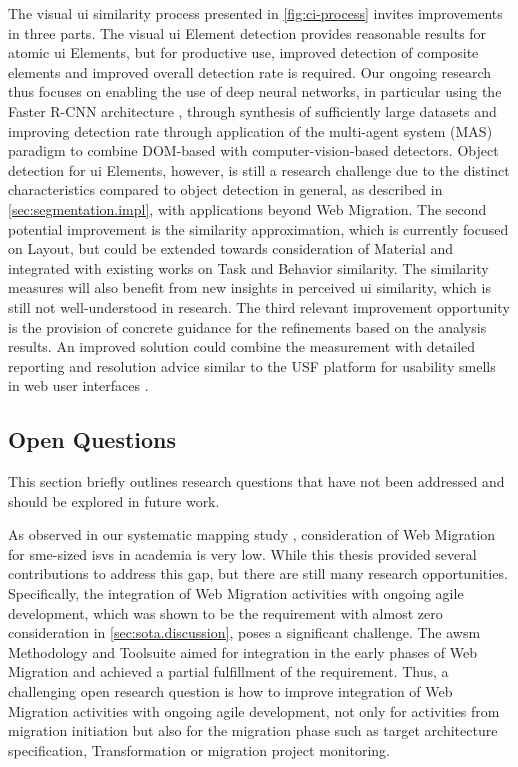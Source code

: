 The visual \gls{ui} similarity process presented in \cref{fig:ci-process} invites improvements in three parts.
The visual \gls{ui} Element detection provides reasonable results for atomic \gls{ui} Elements, but for productive use, improved detection of composite elements and improved overall detection rate is required.
Our ongoing research thus focuses on enabling the use of deep neural networks, in particular using the Faster R-CNN architecture \autocite{Ren2017Faster-RCNN}, through synthesis of sufficiently large datasets and improving detection rate through application of the multi-agent system (MAS) paradigm to combine DOM-based with computer-vision-based detectors.
Object detection for \gls{ui} Elements, however, is still a research challenge due to the distinct characteristics compared to object detection in general, as described in \cref{sec:segmentation.impl}, with applications beyond \gls{Web Migration}.
The second potential improvement is the similarity approximation, which is currently focused on Layout, but could be extended towards consideration of Material and integrated with existing works on Task and Behavior similarity.
The similarity measures will also benefit from new insights in perceived \gls{ui} similarity, which is still not well-understood in research.
The third relevant improvement opportunity is the provision of concrete guidance for the refinements based on the analysis results.
An improved solution could combine the measurement with detailed reporting and resolution advice similar to the USF platform for usability smells in \gls{web} user interfaces \autocite{Grigera2017}.

\vspace{-10pt}
\hypertarget{open-questions}{%
\subsection{Open Questions}\label{open-questions}}
\vspace{10pt}

This section briefly outlines research questions that have not been addressed and should be explored in future work.

As observed in our systematic mapping study \autocite{Heil2017Survey}, consideration of \gls{Web Migration} for \gls{sme}-sized \glspl{isv} in academia is very low.
While this thesis provided several contributions to address this gap, but there are still many research opportunities.
Specifically, the integration of \gls{Web Migration} activities with ongoing agile development, which was shown to be the requirement with almost zero consideration in \cref{sec:sota.discussion}, poses a significant challenge.
The \gls{awsm} Methodology and Toolsuite aimed for integration in the early phases of \gls{Web Migration} and achieved a partial fulfillment of the requirement.
Thus, a challenging open research question is how to improve integration of \gls{Web Migration} activities with ongoing agile development, not only for activities from migration initiation but also for the migration phase such as target architecture specification, \gls{Transformation} or migration project monitoring.

